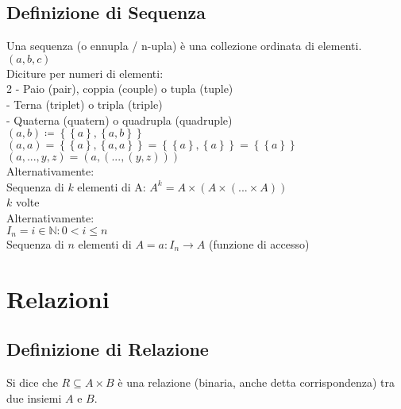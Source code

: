 \documentclass[a4paper, twoside, italian, 11pt]{book}
\newcommand{\braces}[1] {\left \{ #1 \right \}}
\newcommand{\N}{\mathbb N}
\begin{document}
\section{Definizione di Sequenza}

Una sequenza (o ennupla / n-upla) è una collezione ordinata di elementi. \\

$(a, b, c)$ \\

\noindent
Diciture per numeri di elementi: \\

2 - Paio (pair), coppia (couple) o tupla (tuple) \\
 - Terna (triplet) o tripla (triple) \\
 - Quaterna (quatern) o quadrupla (quadruple) \\

\noindent
$(a, b) \coloneqq \braces{\braces{a}, \braces{a, b}}$ \\
$(a, a) = \braces{\braces{a}, \braces{a, a}} = \braces{\braces{a}, \braces{a}} = \braces{\braces{a}}$ \\
$(a, ..., y, z) = (a, (..., (y, z)))$ \\

\noindent
Alternativamente: \\
\indent
Sequenza di $k$ elementi di A: $A^k = A \times (A \times (... \times A))$ \\
\indent
$k$ volte \\

\noindent
Alternativamente: \\
\indent
$I_n = {i \in \N : 0 < i \leq n}$ \\
\indent
Sequenza di $n$ elementi di $A = a : I_n \rightarrow A$ (funzione di accesso)



\chapter{Relazioni}



\section{Definizione di Relazione}

Si dice che $R \subseteq A \times B$ è una relazione (binaria, anche detta corrispondenza) tra due insiemi $A$ e $B$.\\
\end{document}
